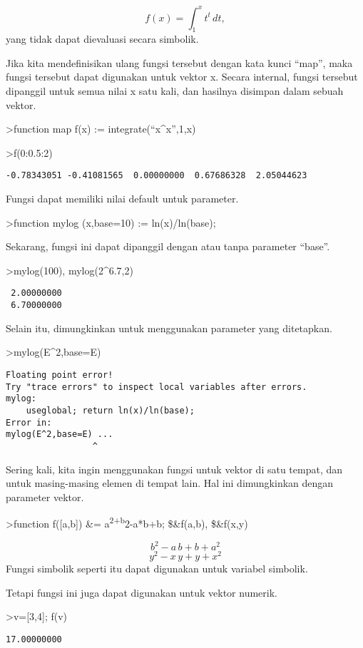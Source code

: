 \documentclass[
]{book}
\begin{document}
\[f(x) = \int_1^x t^t \, dt,\]yang tidak dapat dievaluasi secara simbolik.

Jika kita mendefinisikan ulang fungsi tersebut dengan kata kunci ``map'', maka fungsi tersebut dapat digunakan untuk vektor x. Secara internal, fungsi tersebut dipanggil untuk semua nilai x satu kali, dan hasilnya disimpan dalam sebuah vektor.

\textgreater function map f(x) := integrate(``x\^{}x'',1,x)

\textgreater f(0:0.5:2)

\begin{verbatim}
-0.78343051 -0.41081565  0.00000000  0.67686328  2.05044623 
\end{verbatim}

Fungsi dapat memiliki nilai default untuk parameter.

\textgreater function mylog (x,base=10) := ln(x)/ln(base);

Sekarang, fungsi ini dapat dipanggil dengan atau tanpa parameter ``base''.

\textgreater mylog(100), mylog(2\^{}6.7,2)

\begin{verbatim}
 2.00000000 
 6.70000000 
\end{verbatim}

Selain itu, dimungkinkan untuk menggunakan parameter yang ditetapkan.

\textgreater mylog(E\^{}2,base=E)

\begin{verbatim}
Floating point error!
Try "trace errors" to inspect local variables after errors.
mylog:
    useglobal; return ln(x)/ln(base); 
Error in:
mylog(E^2,base=E) ...
                 ^
\end{verbatim}

Sering kali, kita ingin menggunakan fungsi untuk vektor di satu tempat, dan untuk masing-masing elemen di tempat lain. Hal ini dimungkinkan dengan parameter vektor.

\textgreater function f({[}a,b{]}) \&= a\textsuperscript{2+b}2-a*b+b; \$\&f(a,b), \$\&f(x,y)

\[b^2-a\,b+b+a^2\]\[y^2-x\,y+y+x^2\]Fungsi simbolik seperti itu dapat digunakan untuk variabel simbolik.

Tetapi fungsi ini juga dapat digunakan untuk vektor numerik.

\textgreater v={[}3,4{]}; f(v)

\begin{verbatim}
17.00000000 
\end{verbatim}
\end{document}
